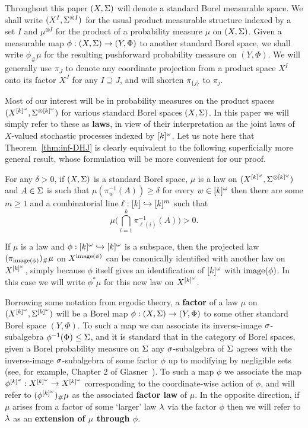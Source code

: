 \documentclass[11pt]{article}
\begin{document}
Throughout this paper $(X,\S)$ will denote a standard Borel
measurable space. We shall write $(X^I,\S^{\otimes I})$ for the
usual product measurable structure indexed by a set $I$ and
$\mu^{\otimes I}$ for the product of a probability measure $\mu$ on
$(X,\S)$. Given a measurable map $\phi:(X,\S)\to (Y,\Phi)$ to
another standard Borel space, we shall write $\phi_\#\mu$ for the
resulting pushforward probability measure on $(Y,\Phi)$.  We will
generally use $\pi_J$ to denote any coordinate projection from a
product space $X^I$ onto its factor $X^J$ for any $I \supseteq J$,
and will shorten $\pi_{\{j\}}$ to $\pi_j$.

Most of our interest will be in probability measures on the product
spaces $(X^{[k]^\o},\S^{\otimes [k]^\o})$ for various standard Borel
spaces $(X,\S)$.  In this paper we will simply refer to these as
\textbf{laws}, in view of their interpretation as the joint laws of
$X$-valued stochastic processes indexed by $[k]^\o$. Let us note
here that Theorem~\ref{thm:inf-DHJ} is clearly equivalent to the
following superficially more general result, whose formulation will
be more convenient for our proof.

\begin{thm}\label{thm:inf-DHJ2}
For any $\delta > 0$, if $(X,\S)$ is a standard Borel space, $\mu$
is a law on $(X^{[k]^\o},\S^{\otimes [k]^\o})$ and $A \in \S$ is such
that $\mu(\pi_w^{-1}(A))\geq \delta$ for every $w \in [k]^\o$ then
there are some $m\geq 1$ and a combinatorial line $\ell:[k]\into
[k]^m$ such that
\[\mu\Big(\bigcap_{i=1}^k\pi_{\ell(i)}^{-1}(A)\Big) > 0.\]
\end{thm}

If $\mu$ is a law and $\phi:[k]^\o \into [k]^\o$ is a subspace, then
the projected law $(\pi_{\rm{image}(\phi)})_\#\mu$ on
$X^{\rm{image}(\phi)}$ can be canonically identified with
another law on $X^{[k]^\o}$, simply because $\phi$ itself gives an
identification of $[k]^\o$ with $\rm{image}(\phi)$. In this case we
will write $\phi^\ast\mu$ for this new law on $X^{[k]^\o}$.

Borrowing some notation from ergodic theory, a \textbf{factor} of a
law $\mu$ on $(X^{[k]^\o},\S^{[k]^\o})$ will be a Borel map
$\phi:(X,\S)\to (Y,\Phi)$ to some other standard Borel space
$(Y,\Phi)$.  To such a map we can associate its inverse-image
$\s$-subalgebra $\phi^{-1}(\Phi)\leq \S$, and it is standard that in
the category of Borel spaces, given a Borel probability measure on
$\S$ any $\s$-subalgebra of $\S$ agrees with the inverse-image
$\s$-subalgebra of some factor $\phi$ up to modifying by negligible
sets (see, for example, Chapter 2 of Glasner~\cite{Gla03}).  To such
a map $\phi$ we associate the map $\phi^{[k]^\o}:X^{[k]^\o}\to X^{[k]^\o}$
corresponding to the coordinate-wise action of $\phi$, and will
refer to $(\phi^{[k]^\o})_\#\mu$ as the associated \textbf{factor
law} of $\mu$.  In the opposite direction, if $\mu$ arises from a
factor of some `larger' law $\l$ via the factor $\phi$ then we will
refer to $\l$ as an \textbf{extension of $\mu$ through $\phi$}.
\end{document}
